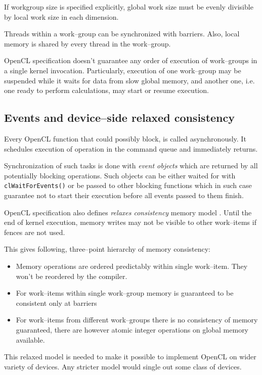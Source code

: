 If workgroup size is specified explicitly, global work size must be evenly
divisible by local work size in each dimension.

Threads within a work--group can be synchronized with barriers. Also, local
memory is shared by every thread in the work--group.

OpenCL specification doesn't guarantee any order of execution of work--groups
in a single kernel invocation. Particularly, execution of one work--group may be
suspended while it waits for data from slow global memory, and another one,
i.e. one ready to perform calculations, may start or resume execution.

\subsection{Events and device--side relaxed consistency}
\label{sub:clevents}

Every OpenCL function that could possibly block, is called asynchronously. It
schedules execution of operation in the command queue and immediately returns.

Synchronization of such tasks is done with \emph{event objects} which are
returned by all potentially blocking operations. Such objects can be either
waited for with \texttt{clWaitForEvents()} or be passed to other blocking
functions which in such case guarantee not to start their execution before all
events passed to them finish.

OpenCL specification also defines \emph{relaxes consistency} memory model \parencite{gaster2012heterogeneous}.
Until the end of kernel execution, memory writes may not be visible to other
work--items if fences are not used.

This gives following, three--point hierarchy of memory consistency:
\begin{itemize}
  \item Memory operations are ordered predictably within single work--item. They
    won't be reordered by the compiler.
  \item For work--items within single work--group memory is guaranteed to be
    consistent only at barriers
  \item For work--items from different work--groups there is no consistency of
    memory guaranteed, there are however atomic integer operations on global
    memory available.
\end{itemize}

This relaxed model is needed to make it possible to implement OpenCL on wider
variety of devices. Any stricter model would single out some class of devices.

